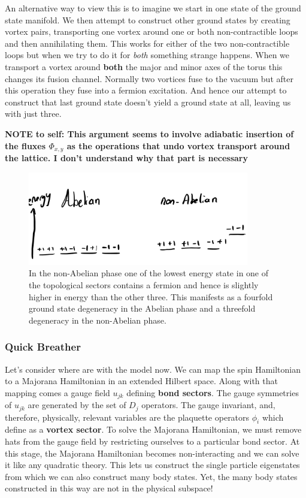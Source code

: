 An alternative way to view this is to imagine we start in one state of the ground state manifold. We then attempt to construct other ground states by creating vortex pairs, transporting one vortex around one or both non-contractible loops and then annihilating them. This works for either of the two non-contractible loops but when we try to do it for \emph{both} something strange happens. When we transport a vortex around \textbf{both} the major and minor axes of the torus this changes its fusion channel. Normally two vortices fuse to the vacuum but after this operation they fuse into a fermion excitation. And hence our attempt to construct that last ground state doesn't yield a ground state at all, leaving us with just three.

\textbf{NOTE to self: This argument seems to involve adiabatic insertion of the fluxes \(\Phi_{x,y}\) as the operations that undo vortex transport around the lattice. I don't understand why that part is necessary}

\begin{figure}
\hypertarget{fig:threefold_degeneracy}{%
\centering
\includegraphics[width=0.86\textwidth,height=\textheight]{figure_code/amk_chapter/threefold_degeneracy.png}
\caption{In the non-Abelian phase one of the lowest energy state in one of the topological sectors contains a fermion and hence is slightly higher in energy than the other three. This manifests as a fourfold ground state degeneracy in the Abelian phase and a threefold degeneracy in the non-Abelian phase.}\label{fig:threefold_degeneracy}
}
\end{figure}

\hypertarget{quick-breather}{%
\subsubsection{Quick Breather}\label{quick-breather}}

Let's consider where are with the model now. We can map the spin Hamiltonian to a Majorana Hamiltonian in an extended Hilbert space. Along with that mapping comes a gauge field \(u_{jk}\) defining \textbf{bond sectors}. The gauge symmetries of \(u_{jk}\) are generated by the set of \(D_j\) operators. The gauge invariant, and, therefore, physically, relevant variables are the plaquette operators \(\phi_i\) which define as a \textbf{vortex sector}. To solve the Majorana Hamiltonian, we must remove hats from the gauge field by restricting ourselves to a particular bond sector. At this stage, the Majorana Hamiltonian becomes non-interacting and we can solve it like any quadratic theory. This lets us construct the single particle eigenstates from which we can also construct many body states. Yet, the many body states constructed in this way are not in the physical subspace!

